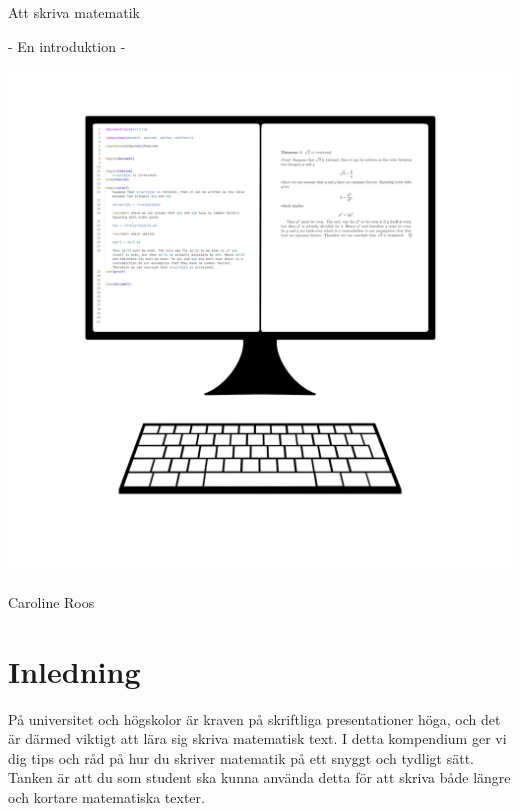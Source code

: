 \documentclass[titlepage]{article}
\begin{document}
\begin{titlepage}
\begin{center}
    \Huge Att skriva matematik 
    \vspace{2mm}

    \noindent \Large - En introduktion -

    \vfill

    \includegraphics[width = \linewidth]{frontv2.png}
    \vfill

    \large
    Caroline Roos

\end{center}    
\end{titlepage}


\tableofcontents
\thispagestyle{empty}

\newpage
\setcounter{page}{1}




\section{Inledning}

På universitet och högskolor är kraven på skriftliga presentationer höga, och det är därmed viktigt att lära sig skriva matematisk text. I detta kompendium ger vi dig tips och råd på hur du skriver matematik på ett snyggt och tydligt sätt. Tanken är att du som student ska kunna använda detta för att skriva både längre och kortare matematiska texter.
\end{document}
